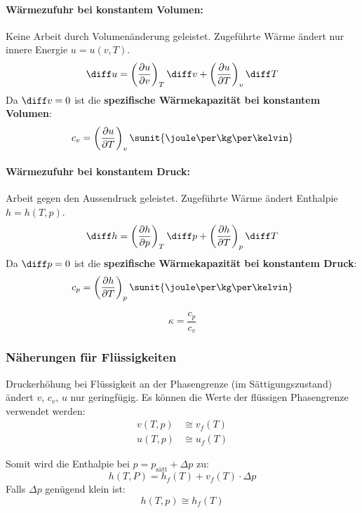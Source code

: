 			\paragraph{Wärmezufuhr bei konstantem Volumen:} %
				
				Keine Arbeit durch Volumenänderung geleistet. Zugeführte Wärme ändert nur innere Energie $u = u(v,T)$.
				\[
					\diff u = \left(\frac{\partial u}{\partial v}\right)_T \diff v + \left(\frac{\partial u}{\partial T}\right)_v \diff T
				\]
				Da $\diff v = 0$ ist die \textbf{spezifische Wärmekapazität bei konstantem Volumen}:
				\[
					c_{v} = \left(\frac{\partial u}{\partial T}\right)_v \sunit{\joule\per\kg\per\kelvin}
				\]
				
			
			\paragraph{Wärmezufuhr bei konstantem Druck:} %
				
				Arbeit gegen den Aussendruck geleistet. Zugeführte Wärme ändert Enthalpie $h = h(T,p)$.
				\[
					\diff h = \left(\frac{\partial h}{\partial p}\right)_T \diff p + \left(\frac{\partial h}{\partial T}\right)_p \diff T
				\]
				Da $\diff p = 0$ ist die \textbf{spezifische Wärmekapazität bei konstantem Druck}:
				\[
					c_{p} = \left(\frac{\partial h}{\partial T}\right)_p \sunit{\joule\per\kg\per\kelvin}
				\]
				
			
			\[
				\kappa = \frac{c_p}{c_v}
			\]
			
		
		\subsubsection{Näherungen für Flüssigkeiten} %
			
			Druckerhöhung bei Flüssigkeit an der Phasengrenze (im Sättigungszustand) ändert $v$, $c_v$, $u$ nur geringfügig.
			Es können die Werte der flüssigen Phasengrenze verwendet werden:
			\begin{align*}
				v(T,p)&\cong v_f(T) \\
				u(T,p)&\cong u_f(T)
			\end{align*}
			
			Somit wird die Enthalpie bei $p = p_{\text{sätt}} + \Delta p$ zu:
			\[
				h(T,P) = h_f(T) + v_f(T) \cdot \Delta p
			\]
			Falls $\Delta p$ genügend klein ist:
			\[
				h(T,p) \cong h_f(T)
			\]
			
